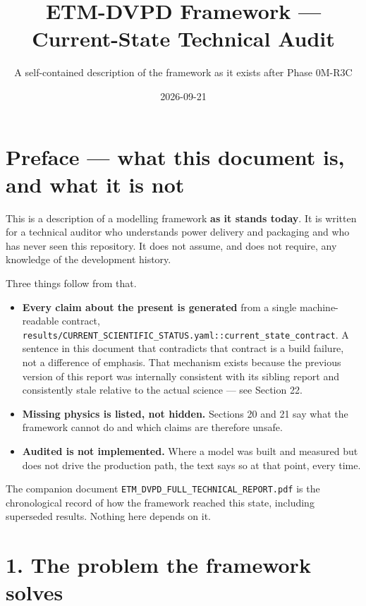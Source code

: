 \documentclass[10pt,]{article}
\title{ETM-DVPD Framework --- Current-State Technical Audit}
\subtitle{A self-contained description of the framework as it exists after Phase
0M-R3C}
\date{2026-09-21}
\providecommand{\tightlist}{%
  \setlength{\itemsep}{0pt}\setlength{\parskip}{0pt}}
\begin{document}
\maketitle

{
\hypersetup{linkcolor=}
\setcounter{tocdepth}{2}
\tableofcontents
}
\hypertarget{preface-what-this-document-is-and-what-it-is-not}{%
\section{Preface --- what this document is, and what it is
not}\label{preface-what-this-document-is-and-what-it-is-not}}

This is a description of a modelling framework \textbf{as it stands
today}. It is written for a technical auditor who understands power
delivery and packaging and who has never seen this repository. It does
not assume, and does not require, any knowledge of the development
history.

Three things follow from that.

\begin{itemize}
\tightlist
\item
  \textbf{Every claim about the present is generated} from a single
  machine-readable contract,
  \texttt{results/CURRENT\_SCIENTIFIC\_STATUS.yaml::current\_state\_contract}.
  A sentence in this document that contradicts that contract is a build
  failure, not a difference of emphasis. That mechanism exists because
  the previous version of this report was internally consistent with its
  sibling report and consistently stale relative to the actual science
  --- see Section 22.
\item
  \textbf{Missing physics is listed, not hidden.} Sections 20 and 21 say
  what the framework cannot do and which claims are therefore unsafe.
\item
  \textbf{Audited is not implemented.} Where a model was built and
  measured but does not drive the production path, the text says so at
  that point, every time.
\end{itemize}

The companion document \texttt{ETM\_DVPD\_FULL\_TECHNICAL\_REPORT.pdf}
is the chronological record of how the framework reached this state,
including superseded results. Nothing here depends on it.

\newpage

\hypertarget{the-problem-the-framework-solves}{%
\section{1. The problem the framework
solves}\label{the-problem-the-framework-solves}}
\end{document}

